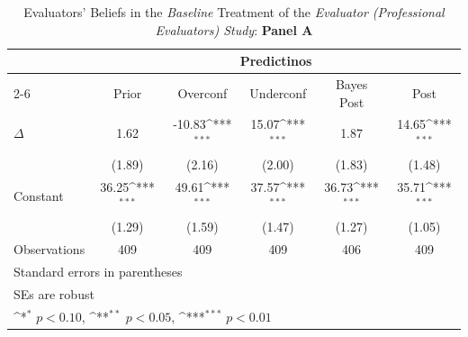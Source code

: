 \begin{table}[htbp]\centering
\def\sym#1{\ifmmode^{#1}\else\(^{#1}\)\fi}
\caption{Evaluators' Beliefs in the \textit{Baseline} Treatment of the \textit{Evaluator (Professional Evaluators) Study}: \textbf{Panel A}}
\begin{tabular}{l*{5}{c}}
\hline\hline
                &\multicolumn{5}{c}{Predictinos}                                                               \\\cmidrule(lr){2-6}
                &\multicolumn{1}{c}{Prior}&\multicolumn{1}{c}{Overconf}&\multicolumn{1}{c}{Underconf}&\multicolumn{1}{c}{Bayes Post}&\multicolumn{1}{c}{Post}\\
\hline
$\Delta$        &     1.62         &   -10.83\sym{***}&    15.07\sym{***}&     1.87         &    14.65\sym{***}\\
                &   (1.89)         &   (2.16)         &   (2.00)         &   (1.83)         &   (1.48)         \\
Constant        &    36.25\sym{***}&    49.61\sym{***}&    37.57\sym{***}&    36.73\sym{***}&    35.71\sym{***}\\
                &   (1.29)         &   (1.59)         &   (1.47)         &   (1.27)         &   (1.05)         \\
\hline
Observations    &      409         &      409         &      409         &      406         &      409         \\
\hline\hline
\multicolumn{6}{l}{\footnotesize Standard errors in parentheses}\\
\multicolumn{6}{l}{\footnotesize SEs are robust}\\
\multicolumn{6}{l}{\footnotesize \sym{*} \(p<0.10\), \sym{**} \(p<0.05\), \sym{***} \(p<0.01\)}\\
\end{tabular}
\end{table}
